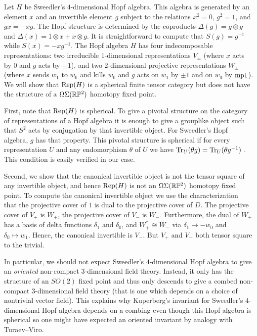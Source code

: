 \documentclass{amsart}
\begin{document}
\begin{example}
Let $H$ be Sweedler's $4$-dimensional Hopf algebra.  This algebra is generated by an element $x$ and an invertible element $g$ subject to the relations $x^2 = 0$, $g^2 = 1$, and $gx = -xg$.  The Hopf structure is determined by the coproducts $\Delta(g) = g \otimes g$ and $\Delta(x) = 1 \otimes x + x \otimes g$.  It is straightforward to compute that $S(g) = g^{-1}$ while $S(x) = - x g^{-1}$.  The Hopf algebra $H$ has four indecomposable representations: two irreducible $1$-dimensional representations $V_{\pm}$ (where $x$ acts by $0$ and $g$ acts by $\pm 1$), and two $2$-dimensional projective representations $W_\pm$ (where $x$ sends $w_1$ to $w_0$ and kills $w_0$ and $g$ acts on $w_1$ by $\pm 1$ and on $w_0$ by $\minusplus 1$). We will show that $\mathrm{Rep}(H)$ is a spherical finite tensor category but does not have the structure of a $\Omega \Sigma (\mathbb R \mathbb P^2)$ homotopy fixed point.

First, note that $\mathrm{Rep}(H)$ is spherical.  To give a pivotal structure on the category of representations of a Hopf algebra it is enough to give a grouplike object such that $S^2$ acts by conjugation by that invertible object.  For Sweedler's Hopf algebra, $g$ has that property.  This pivotal structure is spherical if for every representation $U$ and any endomorphism $\theta$ of $U$ we have $\mathrm{Tr}_U(\theta g) = \mathrm{Tr}_U(\theta g^{-1})$ \cite{MR1686423}.  This condition is easily verified in our case.

Second, we show that the canonical invertible object is not the tensor square of any invertible object, and hence $\mathrm{Rep}(H)$ is not an $\Omega \Sigma (\mathbb R \mathbb P^2)$ homotopy fixed point.  To compute the canonical invertible object we use the characterization that the projective cover of $1$ is dual to the projective cover of $D$.  The projective cover of $V_+$ is $W_+$, the projective cover of $V_-$ is $W_-$.  Furthermore, the dual of $W_+$ has a basis of delta functions $\delta_1$ and $\delta_0$, and $W_+^* \cong W_-$ via $\delta_1 \mapsto -w_0$ and $\delta_0 \mapsto w_1$.  Hence, the canonical invertible is $V_-$.  But $V_+$ and $V_-$ both tensor square to the trivial.
\end{example}

\begin{remark}
In particular, we should not expect Sweedler's $4$-dimensional Hopf algebra to give an \emph{oriented} non-compact $3$-dimensional field theory.  Instead, it only has the structure of an $SO(2)$ fixed point and thus only descends to give a combed non-compact $3$-dimensional field theory (that is one which depends on a choice of nontrivial vector field).  This explains why Kuperberg's invariant for Sweedler's $4$-dimensional Hopf algebra \cite{MR1394749} depends on a combing even though this Hopf algebra is spherical so one might have expected an oriented invariant by analogy with Turaev--Viro.
\end{remark}
\end{document}
